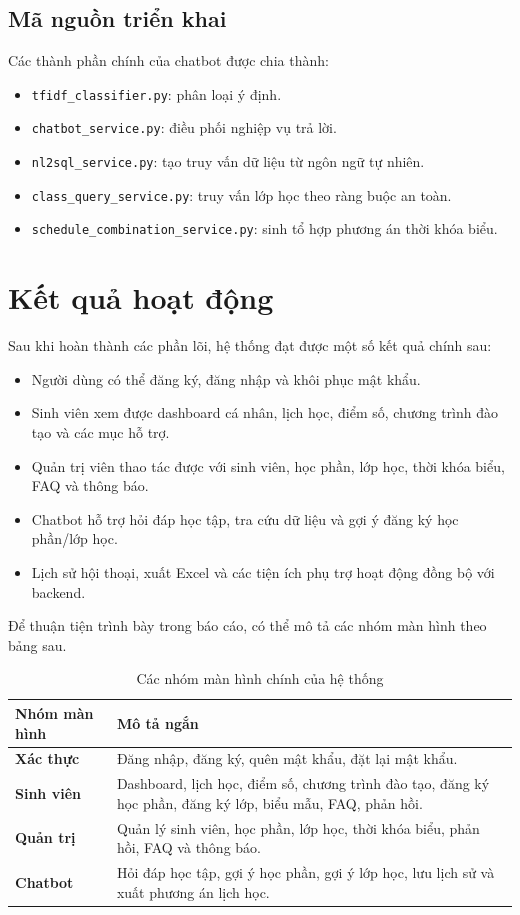 \documentclass[12pt,a4paper]{report}
\begin{document}
\subsection{Mã nguồn triển khai}
Các thành phần chính của chatbot được chia thành:
\begin{itemize}
    \item \texttt{tfidf\_classifier.py}: phân loại ý định.
    \item \texttt{chatbot\_service.py}: điều phối nghiệp vụ trả lời.
    \item \texttt{nl2sql\_service.py}: tạo truy vấn dữ liệu từ ngôn ngữ tự nhiên.
    \item \texttt{class\_query\_service.py}: truy vấn lớp học theo ràng buộc an toàn.
    \item \texttt{schedule\_combination\_service.py}: sinh tổ hợp phương án thời khóa biểu.
\end{itemize}

\section{Kết quả hoạt động}
Sau khi hoàn thành các phần lõi, hệ thống đạt được một số kết quả chính sau:
\begin{itemize}
    \item Người dùng có thể đăng ký, đăng nhập và khôi phục mật khẩu.
    \item Sinh viên xem được dashboard cá nhân, lịch học, điểm số, chương trình đào tạo và các mục hỗ trợ.
    \item Quản trị viên thao tác được với sinh viên, học phần, lớp học, thời khóa biểu, FAQ và thông báo.
    \item Chatbot hỗ trợ hỏi đáp học tập, tra cứu dữ liệu và gợi ý đăng ký học phần/lớp học.
    \item Lịch sử hội thoại, xuất Excel và các tiện ích phụ trợ hoạt động đồng bộ với backend.
\end{itemize}

Để thuận tiện trình bày trong báo cáo, có thể mô tả các nhóm màn hình theo bảng sau.

\begin{table}[H]
\centering
\begin{tabularx}{\textwidth}{|l|X|}
\hline
\textbf{Nhóm màn hình} & \textbf{Mô tả ngắn} \\ \hline
\textbf{Xác thực} & Đăng nhập, đăng ký, quên mật khẩu, đặt lại mật khẩu. \\ \hline
\textbf{Sinh viên} & Dashboard, lịch học, điểm số, chương trình đào tạo, đăng ký học phần, đăng ký lớp, biểu mẫu, FAQ, phản hồi. \\ \hline
\textbf{Quản trị} & Quản lý sinh viên, học phần, lớp học, thời khóa biểu, phản hồi, FAQ và thông báo. \\ \hline
\textbf{Chatbot} & Hỏi đáp học tập, gợi ý học phần, gợi ý lớp học, lưu lịch sử và xuất phương án lịch học. \\ \hline
\end{tabularx}
\caption{Các nhóm màn hình chính của hệ thống}
\end{table}
\end{document}
